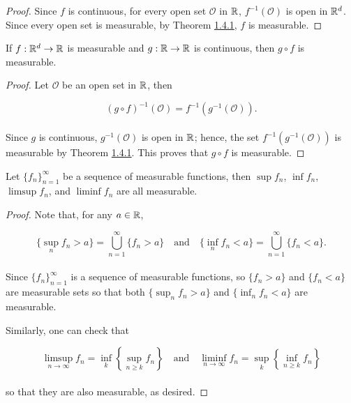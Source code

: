 \documentclass[12pt, a4paper, openany, twoside]{book}
\theoremstyle{definition}
\theoremstyle{remark}
\theoremstyle{plain}
\numberwithin{equation}{section}
\begin{document}
\begin{proof}
    Since $f$ is continuous, for every open set $\mathcal{O}$ in ${\mathbb {R}}$, $f^{-1}(\mathcal{O})$ is open in ${\mathbb {R}}^d$. Since every open set is measurable, by Theorem \hyperref[Theorem 1.4.1]{1.4.1}, $f$ is measurable.
\end{proof}
\vspace{5mm}
\begin{tcolorbox}[colback=yellow!10!white,colframe=red!75!black,title=Corollary 1.4.3]\label{Corollary 1.4.3}
    If $f:{\mathbb {R}}^d\rightarrow{\mathbb {R}}$ is measurable and $g:{\mathbb {R}}\rightarrow{\mathbb {R}}$ is continuous, then $g\circ f$ is measurable.
\end{tcolorbox}
\begin{proof}
    Let $\mathcal{O}$ be an open set in ${\mathbb {R}}$, then 

    \[(g\circ f)^{-1}(\mathcal{O})=f^{-1}(g^{-1}(\mathcal{O})).\]
    \\
    Since $g$ is continuous, $g^{-1}(\mathcal{O})$ is open in ${\mathbb {R}}$; hence, the set $f^{-1}(g^{-1}(\mathcal{O}))$ is measurable by Theorem \hyperref[Theorem 1.4.1]{1.4.1}. This proves that $g\circ f$ is measurable.
\end{proof}
\vspace{5mm}
\begin{tcolorbox}[colback=yellow!10!white,colframe=red!75!black,title=Theorem 1.4.4]\label{Theorem 1.4.4}
    Let $\{f_n\}_{n=1}^{\infty}$ be a sequence of measurable functions, then $\sup{f_n}$, $\inf{f_n}$, $\limsup{f_n}$, and $\liminf{f_n}$ are all measurable.
\end{tcolorbox}
\begin{proof}
    Note that, for any $a\in{\mathbb {R}}$, 

    \[\{\sup_n{f_n}>a\}=\bigcup_{n=1}^{\infty}{\{f_n>a\}}\quad\text{and}\quad \{\inf_n{f_n}<a\}=\bigcup_{n=1}^{\infty}{\{f_n<a\}}.\]
    \\
    Since $\{f_n\}_{n=1}^{\infty}$ is a sequence of measurable functions, so $\{f_n>a\}$ and $\{f_n<a\}$ are measurable sets so that both $\{\sup_n{f_n}>a\}$ and $\{\inf_n{f_n}<a\}$ are measurable. 

    Similarly, one can check that 

    \[\limsup_{n\rightarrow\infty}{f_n}=\inf_{k}{\left\{\sup_{n\geq k}{f_n}\right\}}\quad\text{and}\quad \liminf_{n\rightarrow\infty}{f_n}=\sup_{k}{\left\{\inf_{n\geq k}{f_n}\right\}}\]
    \\
    so that they are also measurable, as desired.
\end{proof}
\vspace{5mm}
\end{document}
